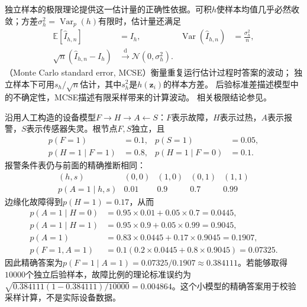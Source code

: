 独立样本的极限理论提供这一估计量的正确性依据。可积$h$使样本均值几乎必然收敛；方差$\sigma_h^2=\operatorname{Var}_p(h)$有限时，估计量还满足
\begin{equation}
  \begin{aligned}
    \mathbb{E}[\widehat I_{h,n}]&=I_h,&
    \operatorname{Var}(\widehat I_{h,n})&=\frac{\sigma_h^2}{n},\\
    \sqrt n(\widehat I_{h,n}-I_h)&\xrightarrow{\mathrm{d}}
      \mathcal{N}(0,\sigma_h^2).
  \end{aligned}
  \label{eq:pgm-sampling-iid-clt}
\end{equation}
（Monte Carlo standard error, MCSE）衡量重复运行估计过程时答案的波动；
独立样本下可用$s_h/\sqrt n$估计，其中$s_h^2$是$h(\bm z_i)$的样本方差。
后验标准差描述模型中的不确定性，MCSE描述有限采样带来的计算波动。
相关极限结论参见。

\begin{example}[报警后的故障概率]
  \label{ex:pgm-sampling-device}
  沿用人工构造的设备模型$F\to H\to A\leftarrow S$：$F$表示故障，$H$表示过热，$A$表示报警，$S$表示传感器失灵。根节点$F,S$独立，且
  \[
    \begin{aligned}
      p(F=1)&=0.1,&p(S=1)&=0.05,\\
      p(H=1\mid F=1)&=0.8,&
      p(H=1\mid F=0)&=0.1.
    \end{aligned}
  \]
  报警条件表仍与前面的精确推断相同：
  \[
    \begin{array}{ccccc}
      (h,s)&(0,0)&(1,0)&(0,1)&(1,1)\\
      p(A=1\mid h,s)&0.01&0.9&0.7&0.99
    \end{array}
  \]
  边缘化故障得到$p(H=1)=0.17$，从而
  \[
    \begin{aligned}
      p(A=1\mid H=0)&=0.95\times0.01+0.05\times0.7=0.0445,\\
      p(A=1\mid H=1)&=0.95\times0.9+0.05\times0.99=0.9045,\\
      p(A=1)&=0.83\times0.0445+0.17\times0.9045=0.1907,\\
      p(F=1,A=1)&=0.1(0.2\times0.0445+0.8\times0.9045)=0.07325.
    \end{aligned}
  \]
  因此精确答案为$p(F=1\mid A=1)=0.07325/0.1907\approx0.384111$。若能够取得$10000$个独立后验样本，故障比例的理论标准误约为$\sqrt{0.384111(1-0.384111)/10000}=0.004864$。这个小模型的精确答案用于校验采样计算，不是实际设备数据。
\end{example}

